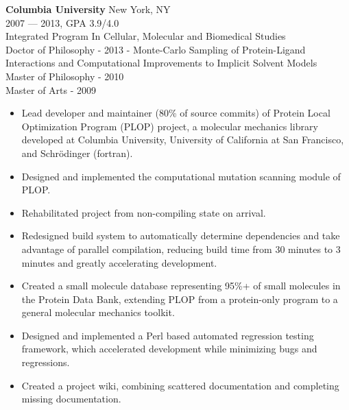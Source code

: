\hrulefill
\vspace{\littleskip}

\myfontsize{\bigheader}
\textbf{Columbia University}
\myfontsize{\bodysize}
New York, NY\\
2007 --- 2013, GPA 3.9/4.0\\
Integrated Program In Cellular, Molecular and Biomedical Studies\\
Doctor of Philosophy - 2013 - Monte-Carlo Sampling of Protein-Ligand Interactions and Computational Improvements to Implicit Solvent Models\\
Master of Philosophy - 2010\\
Master of Arts - 2009\\

\begin{itemize}[topsep=1ex, partopsep=0ex, parsep=0ex, itemsep=0.5ex]
    \item Lead developer and maintainer ({\mytilde}80\% of source commits) of Protein Local Optimization Program (PLOP) project, a molecular mechanics library developed at Columbia University, University of California at San Francisco, and Schr\"{o}dinger (fortran).
    \item Designed and implemented the computational mutation scanning module of PLOP.
    \item Rehabilitated project from non-compiling state on arrival.
    \item Redesigned build system to automatically determine dependencies and take advantage of parallel compilation, reducing build time from {\mytilde}30 minutes to {\mytilde}3 minutes and greatly accelerating development.
    \item Created a small molecule database representing 95\%+ of small molecules in the Protein Data Bank, extending PLOP from a protein-only program to a general molecular mechanics toolkit.
    \item Designed and implemented a Perl based automated regression testing framework, which accelerated development while minimizing bugs and regressions.
    \item Created a project wiki, combining scattered documentation and completing missing documentation.
\end{itemize}

\vspace{\littleskip}



